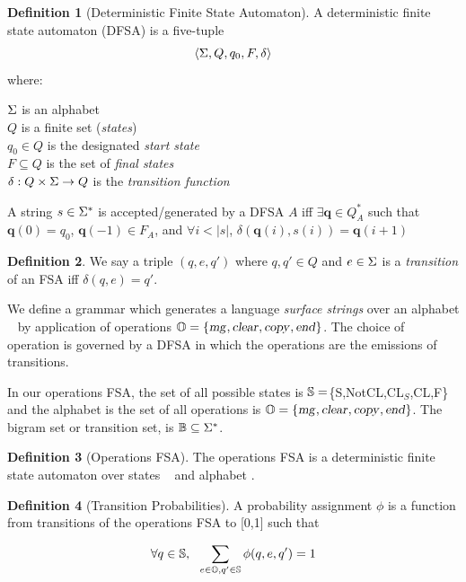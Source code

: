 \documentclass[12pt]{article}
\theoremstyle{definition}
\newtheorem{definition}{Definition}[section]
\begin{document}
\begin{definition}[Deterministic Finite State Automaton]
  A deterministic finite state automaton (DFSA) is a five-tuple 
\[\langle \Sigma, Q, q_0, F, \delta  \rangle  \]
where:

\noindent $\Sigma$ is an alphabet\\
$Q$ is a finite set (\textit{states})\\
$q_0\in Q$ is the designated \textit{start state}\\
$F\subseteq Q$ is the set of \textit{final states}\\
$\delta: Q\times \Sigma \rightarrow Q$ is the \textit{transition function} 

A string $s\in\Sigma^*$ is accepted/generated by a DFSA $A$ iff
$\exists \mathbf{q} \in Q_A^*$ such that $\mathbf{q}(0)=q_0$, $\mathbf{q}(-1)\in F_A$, and $\forall i<|s|$, $\delta(\mathbf{q}(i),s(i))=\mathbf{q}(i+1)$
\label{def:dfsa}
\end{definition}

\begin{definition}
  We say a triple $(q,e,q')$ where $q,q'\in Q$ and $e\in\Sigma$ is a \textit{transition} of an
  FSA iff $\delta(q,e)=q'$.
\end{definition}

We define a grammar which generates a language \textit{surface strings} over an alphabet \sg~ by application of operations $\mathbb{O}=\{\text{\textsl{mg}},\text{\textsl{clear}},\text{\textsl{copy}},\text{\textsl{end}}\}$. The choice of operation is governed by a DFSA in which the operations are the emissions of transitions.

In our operations FSA, the set of all possible states is $\mathbb{S}=$\{S,NotCL,CL$_S$,CL,F\} and the alphabet is the set of all operations is $\mathbb{O}=\{\text{\textsl{mg}},\text{\textsl{clear}},\text{\textsl{copy}},\text{\textsl{end}}\}$. The bigram set or transition set, is $\mathbb{B}\subseteq\Sigma^*$.


\begin{definition}[Operations FSA]
  The operations FSA is a deterministic finite state automaton over states \STATES~ and alphabet \OPS.
\end{definition}

\begin{definition}[Transition Probabilities]
   
  A probability assignment $\phi$ is a function from transitions of the operations FSA to [0,1] such that

$$\forall q\in \mathbb{S},~~\sum_{e\in\mathbb{O},q'\in \mathbb{S}} \phi(q,e,q') = 1 $$

\end{definition}
\end{document}
